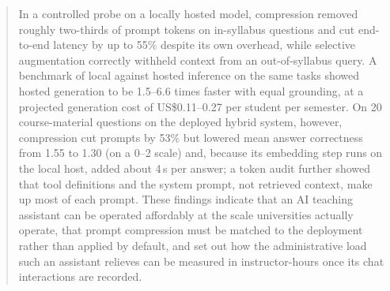 \begin{abstract}
    In a controlled probe on a locally hosted model, compression removed
    roughly two-thirds of prompt tokens on in-syllabus questions and cut
    end-to-end latency by up to 55\% despite its own overhead, while selective
    augmentation correctly withheld context from an out-of-syllabus query.
    A benchmark of local against hosted inference on the same tasks showed
    hosted generation to be 1.5--6.6 times faster with equal grounding,
    at a projected generation cost of US\$0.11--0.27 per student per
    semester.
    On 20 course-material questions on the deployed hybrid system, however,
    compression cut prompts by 53\% but lowered mean answer correctness from
    1.55 to 1.30 (on a 0--2 scale) and, because its embedding step runs on the
    local host, added about 4\,s per answer; a token audit further showed
    that tool definitions and the system prompt, not retrieved context, make
    up most of each prompt. These findings indicate that an AI teaching
    assistant can be operated affordably at the scale universities actually
    operate, that prompt compression must be matched to the deployment rather
    than applied by default, and set out how the administrative load such an
    assistant relieves can be measured in instructor-hours once its chat
    interactions are recorded.

\end{abstract}
